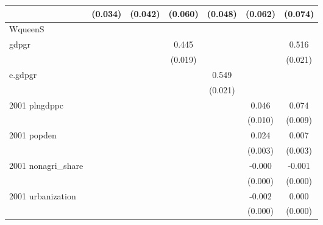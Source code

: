 \begin{table}[htbp]
\begin{tabular}{l*{6}{c}}
                    &     (0.034)         &     (0.042)         &     (0.060)         &     (0.048)         &     (0.062)         &     (0.074)         \\
\hline
WqueenS             &                     &                     &                     &                     &                     &                     \\
gdpgr               &                     &                     &       0.445\sym{***}&                     &                     &       0.516\sym{***}\\
                    &                     &                     &     (0.019)         &                     &                     &     (0.021)         \\
e.gdpgr             &                     &                     &                     &       0.549\sym{***}&                     &                     \\
                    &                     &                     &                     &     (0.021)         &                     &                     \\
2001 plngdppc       &                     &                     &                     &                     &       0.046\sym{***}&       0.074\sym{***}\\
                    &                     &                     &                     &                     &     (0.010)         &     (0.009)         \\
2001 popden         &                     &                     &                     &                     &       0.024\sym{***}&       0.007\sym{***}\\
                    &                     &                     &                     &                     &     (0.003)         &     (0.003)         \\
2001 nonagri\_share  &                     &                     &                     &                     &      -0.000         &      -0.001\sym{***}\\
                    &                     &                     &                     &                     &     (0.000)         &     (0.000)         \\
2001 urbanization   &                     &                     &                     &                     &      -0.002\sym{***}&       0.000         \\
                    &                     &                     &                     &                     &     (0.000)         &     (0.000)         \\

\end{tabular}
\end{table}
